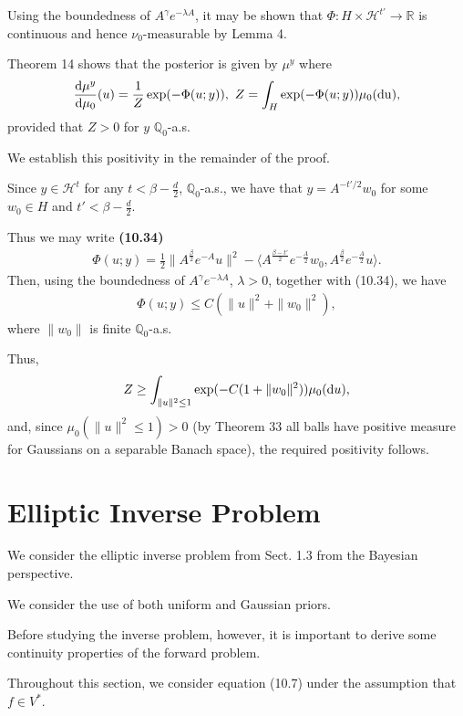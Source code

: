 \documentclass[oneside,11pt]{book}
\numberwithin{equation}{section}
\begin{document}
Using the boundedness of $A^\gamma e^{-\lambda A}$, it may be shown that $\Phi:H\times\mathcal{H}^{t'}\to\mathbb{R}$ is continuous and hence $\nu_0$-measurable by Lemma 4.

%
Theorem 14 shows that the posterior is given by $\mu^y$ where
\begin{align*}
    \frac{{\rm d}\mu^y}{{\rm d}\mu_0}(u) = \frac{1}{Z}\exp(-\Phi(u;y)),\ Z = \int_H \exp(-\Phi(u;y))\mu_0({\rm du}),
\end{align*}
provided that $Z > 0$ for $y$ $\mathbb{Q}_0$-a.s.

We establish this positivity in the remainder of the proof.

Since $y\in\mathcal{H}^t$ for any $t < \beta - \frac{d}{2}$, $\mathbb{Q}_0$-a.s., we have that $y = A^{-t'/2}w_0$ for some $w_0\in H$ and $t' < \beta - \frac{d}{2}$.

Thus we may write \textbf{(10.34)}
\begin{align*}
    \Phi(u;y) = \frac{1}{2}\|A^{\frac{\beta}{2}}e^{-A}u\|^2 - \langle A^{\frac{\beta - t'}{2}}e^{-\frac{A}{2}}w_0,A^{\frac{\beta}{2}}e^{-\frac{A}{2}}u\rangle.
\end{align*}
Then, using the boundedness of $A^\gamma e^{-\lambda A}$, $\lambda > 0$, together with (10.34), we have
\begin{align*}
    \Phi(u;y)\le C(\|u\|^2 + \|w_0\|^2),
\end{align*}
where $\|w_0\|$ is finite $\mathbb{Q}_0$-a.s.

Thus,
\begin{align*}
    Z\ge\int_{\|u\|^2\le 1} \exp(-C(1 + \|w_0\|^2))\mu_0({\rm d}u),
\end{align*}
and, since $\mu_0(\|u\|^2\le 1) > 0$ (by Theorem 33 all balls have positive measure for Gaussians on a separable Banach space), the required positivity follows.

\section{Elliptic Inverse Problem}
We consider the elliptic inverse problem from Sect. 1.3 from the Bayesian perspective.

We consider the use of both uniform and Gaussian priors.

Before studying the inverse problem, however, it is important to derive some continuity properties of the forward problem.

Throughout this section, we consider equation (10.7) under the assumption that $f\in V^*$.
\end{document}
